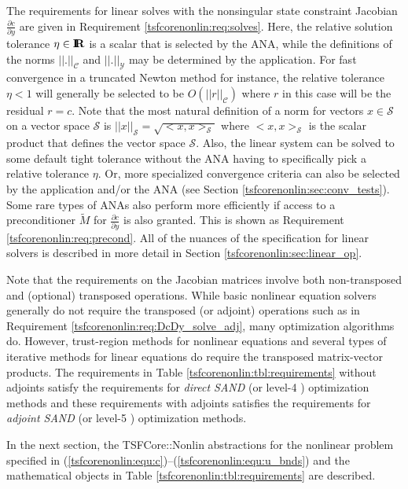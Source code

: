 The requirements for linear solves with the nonsingular state
constraint Jacobian $\frac{\partial c}{\partial y}$ are given in
Requirement \ref{tsfcorenonlin:req:solves}.  Here, the relative solution
tolerance $\eta\in\mbox{\textbf{I}}\hspace{-0.6ex}\mbox{\textbf{R}}$ is a scalar that is selected by the ANA, while
the definitions of the norms $||.||_{\mathcal{C}}$ and
$||.||_{\mathcal{Y}}$ may be determined by the application.  For fast
convergence in a truncated Newton method for instance, the relative
tolerance $\eta < 1$ will generally be selected to be
$O(||r||_{\mathcal{C}})$ where $r$ in this case will be the residual
$r = c$.  Note that the most natural definition of a norm for
vectors $x\in\mathcal{S}$ on a vector space $\mathcal{S}$ is
$||x||_{\mathcal{S}} = \sqrt{<x,x>_{\mathcal{S}}}$ where
$<x,x>_{\mathcal{S}}$ is the scalar product that defines the vector
space $\mathcal{S}$.  Also, the linear system can be solved to some
default tight tolerance without the ANA having to specifically pick a
relative tolerance $\eta$.  Or, more specialized convergence criteria
can also be selected by the application and/or the ANA (see Section
\ref{tsfcorenonlin:sec:conv_tests}).  Some rare types of ANAs also
perform more efficiently if access to a preconditioner $\tilde{M}$ for
$\frac{\partial c}{\partial y}$ is also granted.  This is shown as
Requirement \ref{tsfcorenonlin:req:precond}.  All of the nuances of
the specification for linear solvers is described in more detail in
Section \ref{tsfcorenonlin:sec:linear_op}.

Note that the requirements on the Jacobian matrices involve both
non-transposed and (optional) transposed operations.  While basic
nonlinear equation solvers generally do not require the transposed (or
adjoint) operations such as in Requirement
\ref{tsfcorenonlin:req:DcDy_solve_adj}, many optimization algorithms do.
However, trust-region methods for nonlinear equations and several
types of iterative methods for linear equations do require the
transposed matrix-vector products.  The requirements in Table 
\ref{tsfcorenonlin:tbl:requirements} without adjoints satisfy the requirements
for {\em direct SAND} (or level-4 \cite{ref:PDELDRD}) optimization
methods and these requirements with adjoints satisfies the
requirements for {\em adjoint SAND} (or level-5 \cite{ref:PDELDRD})
optimization methods.

In the next section, the TSFCore::Nonlin abstractions for the
nonlinear problem specified in
(\ref{tsfcorenonlin:equ:c})--(\ref{tsfcorenonlin:equ:u_bnds}) and the
mathematical objects in Table \ref{tsfcorenonlin:tbl:requirements} are
described.

